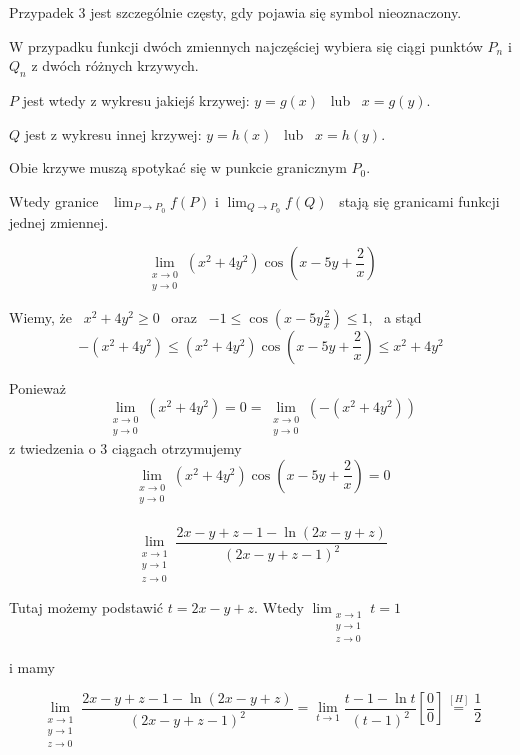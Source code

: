 Przypadek 3 jest szczególnie częsty, gdy pojawia się symbol nieoznaczony.

W przypadku funkcji dwóch zmiennych najczęściej wybiera się ciągi punktów $P_n$ i $Q_n$ z dwóch różnych krzywych.

$P$ jest wtedy z wykresu jakiejś krzywej: $ y=g(x)$ \ lub \ $x=g(y)$.

$Q$ jest z wykresu innej krzywej: $y=h(x)$ \ lub \ $x=h(y)$.

Obie krzywe muszą spotykać się w punkcie granicznym $P_0$.

Wtedy granice \ $ \lim_{P \to P_0} f(P) $ \quad i \quad $ \lim_{Q \to P_0} f(Q) $ \ stają się granicami funkcji jednej zmiennej. \\

\begin{przyklad}

$$ \lim_{\substack{x \to 0 \\ y \to 0}} (x^2 + 4y^2) \cos \left( x - 5y + \frac{2}{x} \right) $$

Wiemy, że \ $ x^2 + 4y^2 \geq 0 $ \ oraz \ $ -1 \leq \cos \left( x - 5y \frac{2}{x} \right) \leq 1 $, \ a stąd
$$ -(x^2 + 4y^2) \leq (x^2 + 4y^2) \cos \left( x - 5y + \frac{2}{x} \right) \leq x^2 + 4y^2 $$

Ponieważ 
$$ \lim_{\substack{x \to 0 \\ y \to 0}} (x^2 + 4y^2) = 0 = \lim_{\substack{x \to 0 \\ y \to 0}} (-(x^2 + 4y^2)) $$
z twiedzenia o 3 ciągach otrzymujemy
$$ \lim_{\substack{x \to 0 \\ y \to 0}} (x^2 + 4y^2) \cos \left( x - 5y + \frac{2}{x} \right) = 0 $$ \\

$$ \lim_{\substack{x \to 1 \\ y \to 1 \\ z \to 0}} \frac{2x - y + z - 1 - \ln(2x - y + z)}{(2x - y + z - 1)^2} $$

Tutaj możemy podstawić $ t = 2x - y + z $. Wtedy $ \lim_{\substack{x \to 1 \\ y \to 1 \\ z \to 0}} t = 1 $

i mamy

$$ \lim_{\substack{x \to 1 \\ y \to 1 \\ z \to 0}} \frac{2x - y + z - 1 - \ln(2x - y + z)}{(2x - y + z - 1)^2}
= \lim_{t \to 1} \frac{t - 1 - \ln t}{(t-1)^2} \left[ \frac{0}{0} \right] \stackrel{[H]}{=} \frac{1}{2}$$
\end{przyklad}

